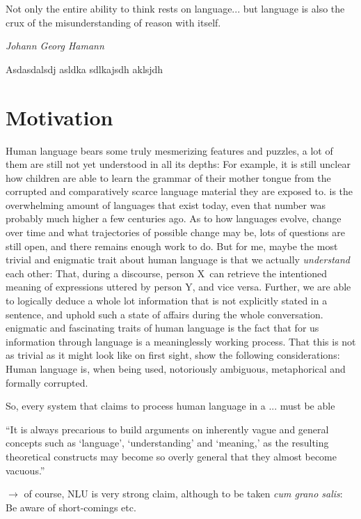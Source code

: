 \label{chap:1_intro}

\epigraph{Not only the entire ability to think rests on language... but language is also the crux of the misunderstanding of reason with itself.}{\textit{Johann Georg Hamann}}

Asdasdalsdj asldka sdlkajsdh aklsjdh

\section{Motivation}


Human language bears some truly mesmerizing features and puzzles, a lot of them are still not
yet understood in all its depths: For example, it is still unclear how children are able to
learn the grammar of their mother tongue from the corrupted and comparatively scarce language
material they are exposed to. %
is the overwhelming amount of languages that exist today, even that number was probably much
higher a few centuries ago.  As to how languages evolve, change over time and what trajectories
of possible change may be, lots of questions are still open, and there remains enough work
to do.  But for me, maybe the most trivial and enigmatic trait about human language is that
we actually \emph{understand} each other: That, during a discourse, person X can retrieve
the intentioned meaning of expressions uttered by person Y, and vice versa.  Further, we are
able to logically deduce a whole lot information that is not explicitly stated in a sentence,
and uphold such a state of affairs during the whole conversation.  %
enigmatic and fascinating traits of human language is the fact that for us %
information through language is a meaninglessly working process.  That this is not as trivial
as it might look like on first sight, show the following considerations: Human language is,
when being used, notoriously ambiguous, metaphorical and formally corrupted.

So, every system that claims to process human language in a ... must be able

``It is always precarious to build arguments on inherently vague and general
concepts such as `language', `understanding' and `meaning,' as the resulting
theoretical constructs may become so overly general that they almost become
vacuous.'' \cite{sahlgren2021singleton}

{\color{red} $\rightarrow$ of course, NLU is very strong claim, although to be taken \emph{cum grano salis}:
Be aware of short-comings etc.}

